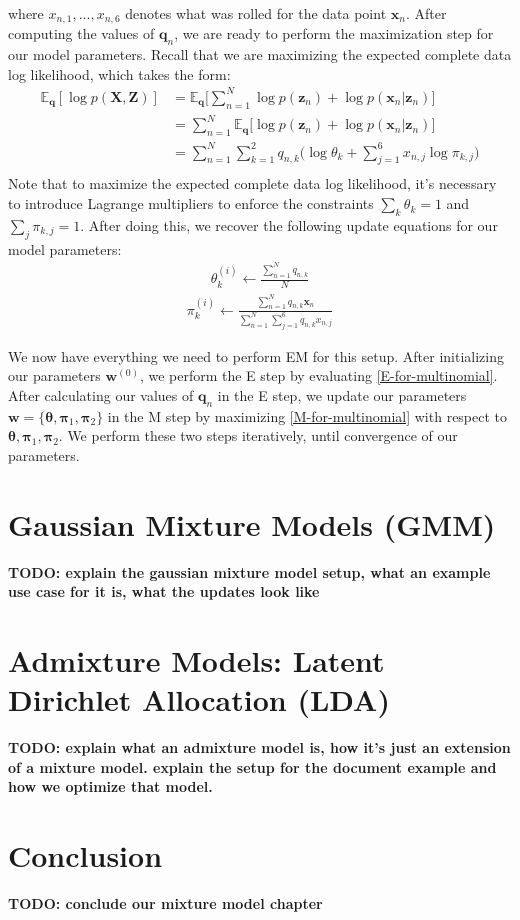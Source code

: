 where $x_{n,1}, ..., x_{n,6}$ denotes what was rolled for the data point $\textbf{x}_n$.
After computing the values of $\textbf{q}_n$, we are ready to perform the maximization step for our model parameters. Recall that we are maximizing the expected complete data log likelihood, which takes the form:
\begin{align} \label{M-for-multinomial}
    \mathbb{E}_{\textbf{q}}[\log p(\textbf{X}, \textbf{Z})] &= \mathbb{E}_{\textbf{q}} \bigg[\sum_{n=1}^{N} \log p(\textbf{z}_n) + \log p(\textbf{x}_n | \textbf{z}_n)\bigg] \\ 
    &= \sum_{n=1}^{N} \mathbb{E}_{\textbf{q}} \bigg[ \log p(\textbf{z}_n) + \log p(\textbf{x}_n | \textbf{z}_n)\bigg] \\ 
    &= \sum_{n=1}^{N} \sum_{k=1}^{2} q_{n, k} \bigg( \log \theta_k + \sum_{j=1}^{6} x_{n, j} \log \pi_{k, j} \bigg) \\ 
\end{align}
Note that to maximize the expected complete data log likelihood, it's necessary to introduce Lagrange multipliers to enforce the constraints $\sum_{k} \theta_k = 1$ and $\sum_{j} \pi_{k, j} = 1$. After doing this, we recover the following update equations for our model parameters:
\begin{align*}
    \theta_{k}^{(i)} \leftarrow \frac{\sum_{n=1}^{N} q_{n, k}}{N}
\end{align*}
\begin{align*}
    \pi_{k}^{(i)} \leftarrow \frac{\sum_{n=1}^{N} q_{n, k} \textbf{x}_{n}}{\sum_{n=1}^{N} \sum_{j=1}^{6} q_{n, k} x_{n, j}}
\end{align*}

We now have everything we need to perform EM for this setup. After initializing our parameters $\textbf{w}^{(0)}$, we perform the E step by evaluating \ref{E-for-multinomial}. After calculating our values of $\textbf{q}_n$ in the E step, we update our parameters $\textbf{w} = \{\boldsymbol{\theta}, \boldsymbol{\pi}_1, \boldsymbol{\pi}_2 \}$ in the M step by maximizing \ref{M-for-multinomial} with respect to $\boldsymbol{\theta}, \boldsymbol{\pi}_1, \boldsymbol{\pi}_2$. We perform these two steps iteratively, until convergence of our parameters.

\section{Gaussian Mixture Models (GMM)}
\textbf{TODO: explain the gaussian mixture model setup, what an example use case for it is, what the updates look like}

\section{Admixture Models: Latent Dirichlet Allocation (LDA)}
\textbf{TODO: explain what an admixture model is, how it's just an extension of a mixture model. explain the setup for the document example and how we optimize that model.}

\section{Conclusion}
\textbf{TODO: conclude our mixture model chapter}
